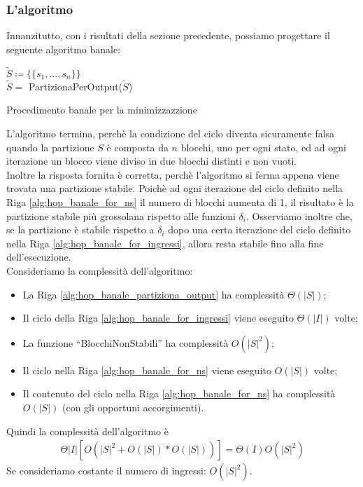 \subsubsection{L'algoritmo}
Innanzitutto, con i risultati della sezione precedente, possiamo progettare il seguente algoritmo banale:\\
\begin{algorithm}[H]
    \SetAlgoLined
    \nl$\widetilde{S} \coloneqq \{\{s_1, \dots, s_n\}\}$\;
    \\
    $\widetilde{S} = $ PartizionaPerOutput($\widetilde{S}$)\;\label{alg:hop_banale_partiziona_output}
     {
        \label{alg:hop_banale_for_ingressi}
    }
    \caption{Procedimento banale per la minimizzazzione}
\end{algorithm}
L'algoritmo termina, perchè la condizione del ciclo diventa sicuramente falsa quando la partizione $S$ è composta da $n$ blocchi, uno per ogni stato, ed ad ogni iterazione un blocco viene diviso in due blocchi distinti e non vuoti. \\
Inoltre la risposta fornita è corretta, perchè l'algoritmo si ferma appena viene trovata una partizione stabile. Poichè ad ogni iterazione del ciclo definito nella Riga \ref*{alg:hop_banale_for_ns} il numero di blocchi aumenta di 1, il risultato è la partizione stabile più grossolana rispetto alle funzioni $\delta_i$. Osserviamo inoltre che, se la partizione è stabile rispetto a $\delta_i$ dopo una certa iterazione del ciclo definito nella Riga \ref*{alg:hop_banale_for_ingressi}, allora resta stabile fino alla fine dell'esecuzione.\\
Consideriamo la complessità dell'algoritmo:
\begin{itemize}
    \item La Riga \ref*{alg:hop_banale_partiziona_output} ha complessità $\Theta(|S|)$;
    \item Il ciclo della Riga \ref*{alg:hop_banale_for_ingressi} viene eseguito $\Theta(|I|)$ volte;
    \item La funzione ``BlocchiNonStabili'' ha complessità $O(|S|^2)$;
    \item Il ciclo nella Riga \ref*{alg:hop_banale_for_ns} viene eseguito $O(|S|)$ volte;
    \item Il contenuto del ciclo nella Riga \ref*{alg:hop_banale_for_ns} ha complessità $O(|S|)$ (con gli opportuni accorgimenti).
\end{itemize}
Quindi la complessità dell'algoritmo è \begin{gather*}
    \Theta|I|\left[O(|S|^2 + O(|S|) * O(|S|))\right] = \Theta(I)O(|S|^2)
\end{gather*}
Se consideriamo costante il numero di ingressi: $O(|S|^2)$.
